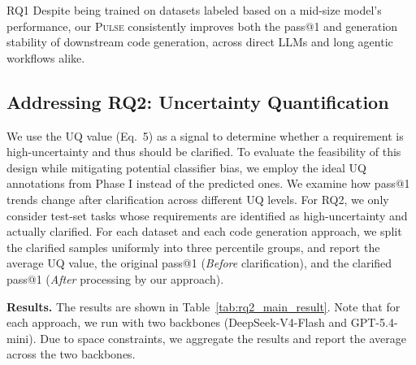 \begin{rqsummary}{RQ1}
    Despite being trained on datasets labeled based on a mid-size model's performance, our \textsc{Pulse} consistently improves both the pass@1 and generation stability of downstream code generation, across direct LLMs and long agentic workflows alike.
\end{rqsummary}


\subsection{Addressing RQ2: Uncertainty Quantification}
\label{sec:rq2}

We use the UQ value (Eq.~5) as a signal to determine whether a requirement is high-uncertainty and thus should be clarified. To evaluate the feasibility of this design while mitigating potential classifier bias, we employ the ideal UQ annotations from Phase I instead of the predicted ones. We examine how pass@1 trends change after clarification across different UQ levels. For RQ2, we only consider test-set tasks whose requirements are identified as high-uncertainty and actually clarified. For each dataset and each code generation approach, we split the clarified samples uniformly into three percentile groups, and report the average UQ value, the original pass@1 (\emph{Before} clarification), and the clarified pass@1 (\emph{After} processing by our approach).

\noindent \textbf{Results.}
The results are shown in Table~\ref{tab:rq2_main_result}. Note that for each approach, we run with two backbones (DeepSeek-V4-Flash and GPT-5.4-mini). Due to space constraints, we aggregate the results and report the average across the two backbones.



